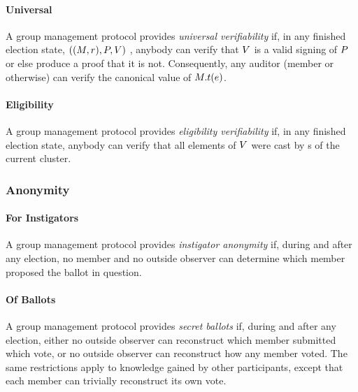   \paragraph{Universal}
  A group management protocol provides \emph{universal verifiability} if, in any
  finished election state, $((M, r), P, V)$ , anybody can
  verify that $V$ is a valid signing of $P$ or else produce a
  proof that it is not. Consequently, any auditor (member or otherwise) can
  verify the canonical value of $M.t(e)$.

  \paragraph{Eligibility}
  A group management protocol provides \emph{eligibility verifiability} if, in
  any finished election state, anybody can verify that all elements of
  $V$ were cast by \KwMember s of the current cluster.

  \subsubsection{Anonymity}
  \paragraph{For Instigators}
  A group management protocol provides \emph{instigator anonymity} if, during
  and after any election, no member and no outside observer can determine
  which member proposed the ballot in question.

  \paragraph{Of Ballots}
  A group management protocol provides \emph{secret ballots} if, during and
  after any election, either no outside observer can reconstruct which member
  submitted which vote, or no outside observer can reconstruct how any
  member voted. The same restrictions apply to knowledge gained by other
  participants, except that each member can trivially reconstruct its own vote.

